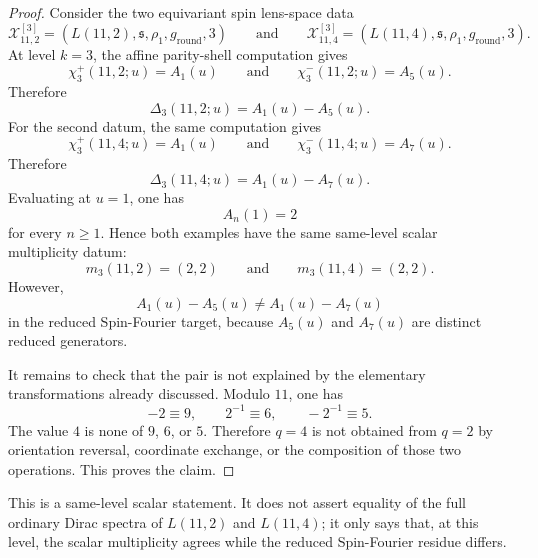 \documentclass{article}
\theoremstyle{definition}
\numberwithin{equation}{section}
\begin{document}
\begin{proof}
Consider the two equivariant spin lens-space data
\begin{equation}
\mathcal X^{[3]}_{11,2}=\left(L(11,2),\mathfrak s,\rho_1,g_{\text{round}},3\right)
\qquad\text{and}\qquad
\mathcal X^{[3]}_{11,4}=\left(L(11,4),\mathfrak s,\rho_1,g_{\text{round}},3\right).
\end{equation}
At level $k=3$, the affine parity-shell computation gives
\begin{equation}
\chi_3^+(11,2;u)=A_1(u)
\qquad\text{and}\qquad
\chi_3^-(11,2;u)=A_5(u).
\end{equation}
Therefore
\begin{equation}
\Delta_3(11,2;u)=A_1(u)-A_5(u).
\end{equation}
For the second datum, the same computation gives
\begin{equation}
\chi_3^+(11,4;u)=A_1(u)
\qquad\text{and}\qquad
\chi_3^-(11,4;u)=A_7(u).
\end{equation}
Therefore
\begin{equation}
\Delta_3(11,4;u)=A_1(u)-A_7(u).
\end{equation}
Evaluating at $u=1$, one has
\begin{equation}
A_n(1)=2
\end{equation}
for every $n\geq 1$.  Hence both examples have the same same-level scalar multiplicity datum:
\begin{equation}
m_3(11,2)=(2,2)
\qquad\text{and}\qquad
m_3(11,4)=(2,2).
\end{equation}
However,
\begin{equation}
A_1(u)-A_5(u)\neq A_1(u)-A_7(u)
\end{equation}
in the reduced Spin-Fourier target, because $A_5(u)$ and $A_7(u)$ are distinct reduced generators.

It remains to check that the pair is not explained by the elementary transformations already discussed.  Modulo $11$, one has
\begin{equation}
-2\equiv 9,
\qquad
2^{-1}\equiv 6,
\qquad
-2^{-1}\equiv 5.
\end{equation}
The value $4$ is none of $9$, $6$, or $5$.  Therefore $q=4$ is not obtained from $q=2$ by orientation reversal, coordinate exchange, or the composition of those two operations.  This proves the claim.
\end{proof}

This is a same-level scalar statement.  It does not assert equality of the full ordinary Dirac spectra of $L(11,2)$ and $L(11,4)$; it only says that, at this level, the scalar multiplicity agrees while the reduced Spin-Fourier residue differs.
\end{document}
